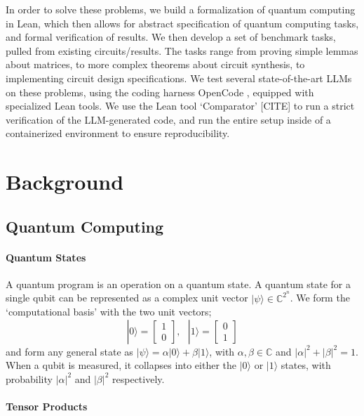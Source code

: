 \documentclass[letterpaper]{article} %
\begin{document}
In order to solve these problems, we build a formalization of quantum computing in Lean,
which then allows for abstract specification of quantum computing tasks, and formal verification of results.
We then develop a set of benchmark tasks, pulled from existing circuits/results.
The tasks range from proving simple lemmas about matrices, to more complex theorems
about circuit synthesis, to implementing circuit design specifications.
We test several state-of-the-art LLMs on these problems, using the coding harness
OpenCode \cite{opencode}, equipped with specialized Lean tools.
We use the Lean tool `Comparator' [CITE] to run a strict verification of the LLM-generated code,
and run the entire setup inside of a containerized environment to ensure reproducibility.



\section{Background}

\subsection{Quantum Computing}

\paragraph{Quantum States}

A quantum program is an operation on a quantum state.
A quantum state for a single qubit can be represented
as a complex unit vector $|\psi\rangle \in \mathbb{C}^{2^n}$.
We form the `computational basis' with the two unit vectors;
\begin{equation}
|0\rangle = \begin{bmatrix} 1 \\ 0 \end{bmatrix}
,~~~
|1\rangle = \begin{bmatrix} 0 \\ 1 \end{bmatrix}
\end{equation}
and form any general state as $|\psi\rangle=\alpha|0\rangle+\beta|1\rangle$,
with $\alpha,\beta\in\mathbb{C}$ and $|\alpha|^2+|\beta|^2=1$.
When a qubit is measured, it collapses into either the $|0\rangle$ or
$|1\rangle$ states, with probability $|\alpha|^2$ and $|\beta|^2$ respectively.

\paragraph{Tensor Products}
\end{document}
